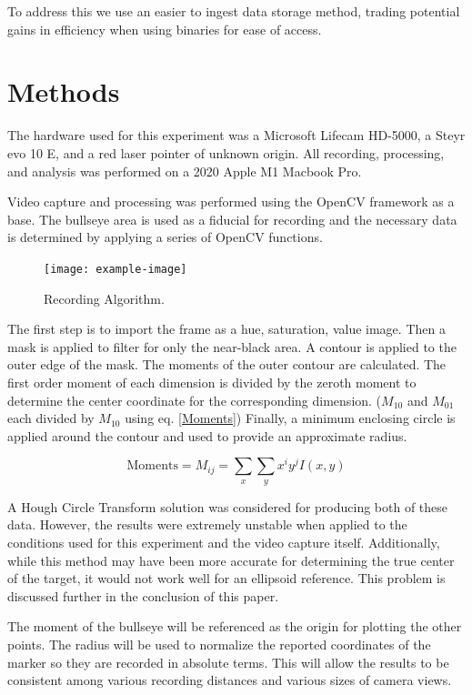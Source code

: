 \documentclass[conference]{IEEEtran}
\begin{document}
To address this we use an easier to ingest data storage method, trading potential gains in efficiency when using binaries for ease of access.

\section{Methods}

The hardware used for this experiment was 
a Microsoft Lifecam HD-5000,
a Steyr evo 10 E,
and a red laser pointer of unknown origin.
All recording, processing, and analysis was performed on 
a 2020 Apple M1 Macbook Pro.

Video capture and processing was performed using the 
OpenCV \cite{itseez2015opencv} framework as a base.
The bullseye area is used as a fiducial for recording and 
the necessary data is determined by applying a series of OpenCV functions.

\begin{figure}[]
	\centering
	\texttt{[image: example-image]}
	\caption{Recording Algorithm.}
	\label{fig:capture_algorithm}
\end{figure}

The first step is to import the frame as a hue, saturation, value image.
Then a mask is applied to filter for only the near-black area.
A contour is applied to the outer edge of the mask.
The moments of the outer contour are calculated.
The first order moment of each dimension is divided by the zeroth moment to determine the center coordinate for the corresponding dimension.
($M_{10}$ and $M_{01}$ each divided by $M_{10}$ using eq. \eqref{Moments})
Finally, a minimum enclosing circle is applied around the contour and used to provide an approximate radius.

\begin{equation}\label{Moments}
	\text{Moments} = M_{ij} = \sum_{x} \sum_{y} x^i y^j I(x,y)
\end{equation}

A Hough Circle Transform solution \cite{Hough1964} was considered for producing both of these data.
However, the results were extremely unstable when applied to the conditions used for this experiment and the video capture itself.
Additionally, while this method may have been more accurate for determining the true center of the target, it would not work well for an ellipsoid reference.
This problem is discussed further in the conclusion of this paper.

The moment of the bullseye will be referenced as the origin for plotting the other points. 
The radius will be used to normalize the reported coordinates of the marker so they are recorded in absolute terms.
This will allow the results to be consistent among various recording distances and various sizes of camera views.
\end{document}
